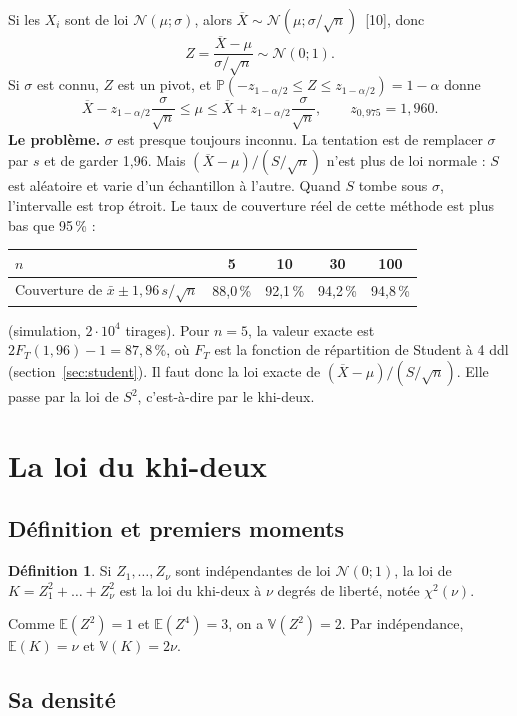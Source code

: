 \documentclass[11pt,a4paper]{article}
\theoremstyle{sj}
\theoremstyle{definition}
\newtheorem{defi}{Définition}
\theoremstyle{remark}
\newcommand{\E}{\mathbb{E}}
\newcommand{\V}{\mathbb{V}}
\newcommand{\N}{\mathcal{N}}
\newcommand{\Xb}{\overline{X}}
\renewcommand{\P}{\mathbb{P}}
\newcommand{\chid}{\chi^2}
\begin{document}
Si les $X_i$ sont de loi $\N(\mu;\sigma)$, alors $\Xb\sim\N(\mu;\sigma/\sqrt n)$~[10], donc
\[
Z=\frac{\Xb-\mu}{\sigma/\sqrt n}\sim\N(0;1).
\]
Si $\sigma$ est connu, $Z$ est un pivot, et $\P(-z_{1-\alpha/2}\le Z\le z_{1-\alpha/2})=1-\alpha$ donne
\[
\Xb-z_{1-\alpha/2}\frac{\sigma}{\sqrt n}\le\mu\le\Xb+z_{1-\alpha/2}\frac{\sigma}{\sqrt n},\qquad z_{0{,}975}=1{,}960.
\]
\textbf{Le problème.} $\sigma$ est presque toujours inconnu. La tentation est de remplacer $\sigma$ par $s$ et de garder 1,96. Mais $(\Xb-\mu)/(S/\sqrt n)$ n'est plus de loi normale : $S$ est aléatoire et varie d'un échantillon à l'autre. Quand $S$ tombe sous $\sigma$, l'intervalle est trop étroit. Le taux de couverture réel de cette méthode est plus bas que 95\,\% :
\begin{center}
\begin{tabular}{l c c c c}
\toprule
$n$ & 5 & 10 & 30 & 100\\
\midrule
Couverture de $\bar x\pm1{,}96\,s/\sqrt n$ & 88,0\,\% & 92,1\,\% & 94,2\,\% & 94,8\,\%\\
\bottomrule
\end{tabular}
\end{center}
(simulation, $2\cdot10^4$ tirages). Pour $n=5$, la valeur exacte est $2F_T(1{,}96)-1=87{,}8\,\%$, où $F_T$ est la fonction de répartition de Student à 4 ddl (section~\ref{sec:student}). Il faut donc la loi exacte de $(\Xb-\mu)/(S/\sqrt n)$. Elle passe par la loi de $S^2$, c'est-à-dire par le khi-deux.

\section{La loi du khi-deux}\label{sec:khi2}

\subsection{Définition et premiers moments}

\begin{defi}
Si $Z_1,\dots,Z_\nu$ sont indépendantes de loi $\N(0;1)$, la loi de $K=Z_1^2+\dots+Z_\nu^2$ est la loi du khi-deux à $\nu$ degrés de liberté, notée $\chid(\nu)$.
\end{defi}

Comme $\E(Z^2)=1$ et $\E(Z^4)=3$, on a $\V(Z^2)=2$. Par indépendance, $\E(K)=\nu$ et $\V(K)=2\nu$.

\subsection{Sa densité}
\end{document}
